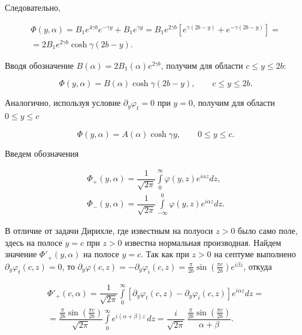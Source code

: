 \documentclass[a4paper,12pt]{article}
\begin{document}
Следовательно,

\begin{multline}
\Phi(y,\alpha)
=
B_1e^{4\gamma b}e^{-\gamma y}
+B_1e^{\gamma y}
=
B_1e^{2\gamma b}
\left[
e^{\gamma(2b-y)}
+e^{-\gamma(2b-y)}
\right] =
\\
=
2B_1e^{2\gamma b}
\cosh\gamma(2b-y).
\end{multline}

Вводя обозначение $B(\alpha) = 2B_1(\alpha)e^{2\gamma b}$, получим для области $c \leq y \leq 2b$:

\begin{equation}
\boxed{
\Phi(y,\alpha)=
B(\alpha)\cosh\gamma(2b-y),
\qquad
c\le y\le 2b.
}
\end{equation}

Аналогично, используя условие $\partial_y\varphi_t = 0$ при $y = 0$, получим для области $0 \leq y \leq c$

\begin{equation}
\boxed{
\Phi(y,\alpha)=
A(\alpha)\cosh\gamma y,
\qquad
0\le y\le c.
}
\end{equation}

Введем обозначения

\begin{gather}
\Phi_+(y, \alpha) = \dfrac{1}{\sqrt{2 \pi}} \int \limits_{0}^{\infty} \varphi(y, z) e^{i \alpha z} d z,
    \\
\Phi_-(y, \alpha) = \dfrac{1}{\sqrt{2 \pi}} \int \limits_{- \infty}^{0} \varphi(y, z) e^{i \alpha z} d z.
\end{gather}

В отличие от задачи Дирихле, где известным на полуоси $z>0$ было само поле, здесь на полосе $y = c$ при $z > 0$ известна нормальная производная. Найдем значение $\Phi'_+(y, \alpha)$ на полосе $y=c$. Так как при $z>0$ на септуме выполнено $\partial_y \varphi_t(c, z) = 0$, то $\partial_y\varphi(c,z) = -\partial_y\varphi_i(c,z) = \frac{\pi}{2b}\sin\!\left(\frac{\pi c}{2b}\right)e^{i\beta z}$, откуда

\begin{multline}
\Phi'_+(c,\alpha) = \dfrac{1}{\sqrt{2 \pi}} \int \limits_{0}^{\infty} [\partial_y\varphi_t(c, z) - \partial_y\varphi_i(c, z)] e^{i \alpha z} d z = \\ = \dfrac{\frac{\pi}{2b}\sin\!\left(\frac{\pi c}{2b}\right)}{\sqrt{2 \pi}} \int \limits_{0}^{\infty} e^{i(\alpha + \beta) z}\, dz = \dfrac{i}{\sqrt{2\pi}}\, \dfrac{\frac{\pi}{2b}\sin\!\left(\frac{\pi c}{2b}\right)}{\alpha+\beta}.
\end{multline}
\end{document}
